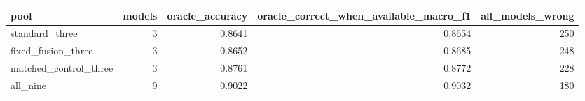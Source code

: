 \begin{tabular}{lrrrr}
\toprule
pool & models & oracle\_accuracy & oracle\_correct\_when\_available\_macro\_f1 & all\_models\_wrong \\
\midrule
standard\_three & 3 & 0.8641 & 0.8654 & 250 \\
fixed\_fusion\_three & 3 & 0.8652 & 0.8685 & 248 \\
matched\_control\_three & 3 & 0.8761 & 0.8772 & 228 \\
all\_nine & 9 & 0.9022 & 0.9032 & 180 \\
\bottomrule
\end{tabular}
